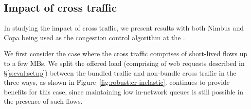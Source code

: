 \subsection{Impact of cross traffic}
In studying the impact of cross traffic, we present results with both Nimbus and Copa being used as the congestion control algorithm at the \inbox.


 We first consider the case where the cross traffic comprises of short-lived flows up to a few MBs.
We split the offered load (comprising of web requests described in \S\ref{s:eval:setup}) between the bundled traffic and non-bundle cross traffic in the three ways, as shown in Figure~\ref{fig:robust:cr-inelastic}. \name continues to provide benefits for this case, since maintaining low in-network queues is still possible in the presence of such flows.

